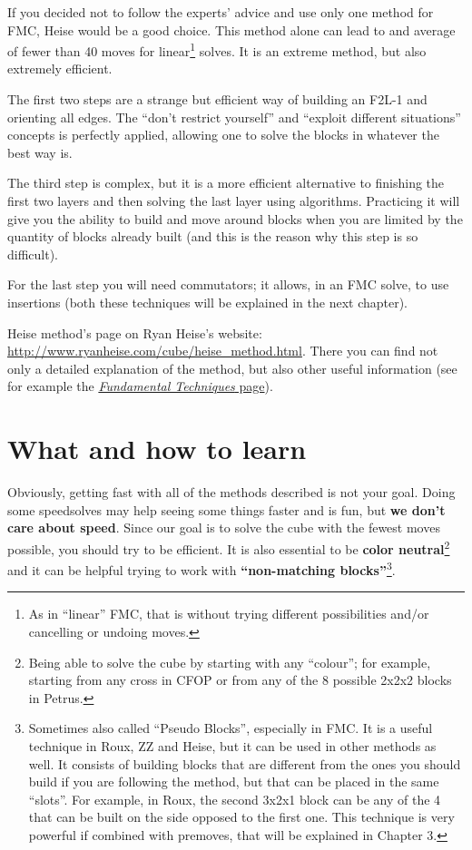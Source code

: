 \documentclass[11pt,a4paper]{book}
\begin{document}
If you decided not to follow the experts' advice and use only one method for FMC, Heise would be a good choice. This method alone can lead to and average of fewer than 40 moves for linear\footnote{As in ``linear'' FMC, that is without trying different possibilities and/or cancelling or undoing moves.} solves. It is an extreme method, but also extremely efficient.

The first two steps are a strange but efficient way of building an F2L-1 and orienting all edges. The ``don't restrict yourself'' and ``exploit different situations'' concepts is perfectly applied, allowing one to solve the blocks in whatever the best way is.

The third step is complex, but it is a more efficient alternative to finishing the first two layers and then solving the last layer using algorithms. Practicing it will give you the ability to build and move around blocks when you are limited by the quantity of blocks already built (and this is the reason why this step is so difficult).

For the last step you will need commutators; it allows, in an FMC solve, to use insertions (both these techniques will be explained in the next chapter).

Heise method's page on Ryan Heise's website: \url{http://www.ryanheise.com/cube/heise_method.html}. There you can find not only a detailed explanation of the method, but also other useful information (see for example the \href{http://www.ryanheise.com/cube/fundamental_techniques.html}{\emph{Fundamental Techniques} page}).

\section{What and how to learn}
Obviously, getting fast with all of the methods described is not your goal. Doing some speedsolves may help seeing some things faster and is fun, but \textbf{we don't care about speed}. Since our goal is to solve the cube with the fewest moves possible, you should try to be efficient. It is also essential to be \textbf{color neutral}\footnote{Being able to solve the cube by starting with any ``colour''; for example, starting from any cross in CFOP or from any of the 8 possible 2x2x2 blocks in Petrus.} and it can be helpful trying to work with \textbf{``non-matching blocks''}\footnote{Sometimes also called ``Pseudo Blocks'', especially in FMC. It is a useful technique in Roux, ZZ and Heise, but it can be used in other methods as well. It consists of building blocks that are different from the ones you should build if you are following the method, but that can be placed in the same ``slots''. For example, in Roux, the second 3x2x1 block can be any of the 4 that can be built on the side opposed to the first one. This technique is very powerful if combined with premoves, that will be explained in Chapter 3.}.
\end{document}

